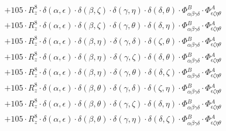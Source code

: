 \documentclass{article}
\begin{document}
\begin{equation}
\begin{array}{c}
 \\[0.2em] 		 + 105 \cdot R_{z}^{8} \cdot \delta{}\left(\alpha{}, \epsilon{}\right) \cdot \delta{}\left(\beta{}, \zeta{}\right) \cdot \delta{}\left(\gamma{}, \eta{}\right) \cdot \delta{}\left(\delta{}, \theta{}\right) \cdot \Phi{}^{B}_{\alpha{}\beta{}\gamma{}\delta{}} \cdot \Phi{}^{A}_{\epsilon{}\zeta{}\eta{}\theta{}} 
 \\[0.2em] 		 + 105 \cdot R_{z}^{8} \cdot \delta{}\left(\alpha{}, \epsilon{}\right) \cdot \delta{}\left(\beta{}, \zeta{}\right) \cdot \delta{}\left(\gamma{}, \theta{}\right) \cdot \delta{}\left(\delta{}, \eta{}\right) \cdot \Phi{}^{B}_{\alpha{}\beta{}\gamma{}\delta{}} \cdot \Phi{}^{A}_{\epsilon{}\zeta{}\eta{}\theta{}} 
 \\[0.2em] 		 + 105 \cdot R_{z}^{8} \cdot \delta{}\left(\alpha{}, \epsilon{}\right) \cdot \delta{}\left(\beta{}, \eta{}\right) \cdot \delta{}\left(\gamma{}, \delta{}\right) \cdot \delta{}\left(\zeta{}, \theta{}\right) \cdot \Phi{}^{B}_{\alpha{}\beta{}\gamma{}\delta{}} \cdot \Phi{}^{A}_{\epsilon{}\zeta{}\eta{}\theta{}} 
 \\[0.2em] 		 + 105 \cdot R_{z}^{8} \cdot \delta{}\left(\alpha{}, \epsilon{}\right) \cdot \delta{}\left(\beta{}, \eta{}\right) \cdot \delta{}\left(\gamma{}, \zeta{}\right) \cdot \delta{}\left(\delta{}, \theta{}\right) \cdot \Phi{}^{B}_{\alpha{}\beta{}\gamma{}\delta{}} \cdot \Phi{}^{A}_{\epsilon{}\zeta{}\eta{}\theta{}} 
 \\[0.2em] 		 + 105 \cdot R_{z}^{8} \cdot \delta{}\left(\alpha{}, \epsilon{}\right) \cdot \delta{}\left(\beta{}, \eta{}\right) \cdot \delta{}\left(\gamma{}, \theta{}\right) \cdot \delta{}\left(\delta{}, \zeta{}\right) \cdot \Phi{}^{B}_{\alpha{}\beta{}\gamma{}\delta{}} \cdot \Phi{}^{A}_{\epsilon{}\zeta{}\eta{}\theta{}} 
 \\[0.2em] 		 + 105 \cdot R_{z}^{8} \cdot \delta{}\left(\alpha{}, \epsilon{}\right) \cdot \delta{}\left(\beta{}, \theta{}\right) \cdot \delta{}\left(\gamma{}, \delta{}\right) \cdot \delta{}\left(\zeta{}, \eta{}\right) \cdot \Phi{}^{B}_{\alpha{}\beta{}\gamma{}\delta{}} \cdot \Phi{}^{A}_{\epsilon{}\zeta{}\eta{}\theta{}} 
 \\[0.2em] 		 + 105 \cdot R_{z}^{8} \cdot \delta{}\left(\alpha{}, \epsilon{}\right) \cdot \delta{}\left(\beta{}, \theta{}\right) \cdot \delta{}\left(\gamma{}, \zeta{}\right) \cdot \delta{}\left(\delta{}, \eta{}\right) \cdot \Phi{}^{B}_{\alpha{}\beta{}\gamma{}\delta{}} \cdot \Phi{}^{A}_{\epsilon{}\zeta{}\eta{}\theta{}} 
 \\[0.2em] 		 + 105 \cdot R_{z}^{8} \cdot \delta{}\left(\alpha{}, \epsilon{}\right) \cdot \delta{}\left(\beta{}, \theta{}\right) \cdot \delta{}\left(\gamma{}, \eta{}\right) \cdot \delta{}\left(\delta{}, \zeta{}\right) \cdot \Phi{}^{B}_{\alpha{}\beta{}\gamma{}\delta{}} \cdot \Phi{}^{A}_{\epsilon{}\zeta{}\eta{}\theta{}} 

\end{array}
\end{equation}
\end{document}
